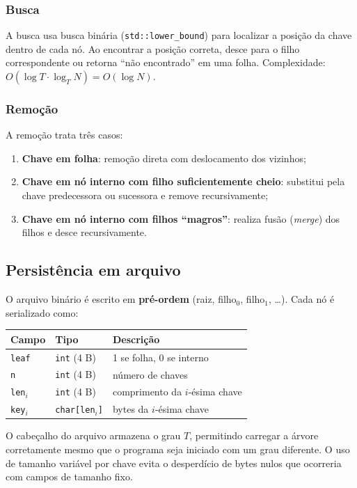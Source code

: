 \documentclass{ifpr-pinhais}
\begin{document}
\subsubsection{Busca}

A busca usa busca binária (\texttt{std::lower\_bound}) para localizar a posição da chave dentro de cada nó. Ao encontrar a posição correta, desce para o filho correspondente ou retorna ``não encontrado'' em uma folha. Complexidade: $O(\log T \cdot \log_T N) = O(\log N)$.

\subsubsection{Remoção}

A remoção trata três casos:
\begin{enumerate}
    \item \textbf{Chave em folha}: remoção direta com deslocamento dos vizinhos;
    \item \textbf{Chave em nó interno com filho suficientemente cheio}: substitui pela chave predecessora ou sucessora e remove recursivamente;
    \item \textbf{Chave em nó interno com filhos ``magros''}: realiza fusão (\textit{merge}) dos filhos e desce recursivamente.
\end{enumerate}

\subsection{Persistência em arquivo}

O arquivo binário é escrito em \textbf{pré-ordem} (raiz, filho$_0$, filho$_1$, \ldots). Cada nó é serializado como:

\begin{center}
\begin{tabular}{lll}
\toprule
Campo & Tipo & Descrição \\
\midrule
\texttt{leaf} & \texttt{int} (4 B) & 1 se folha, 0 se interno \\
\texttt{n} & \texttt{int} (4 B) & número de chaves \\
\texttt{len$_i$} & \texttt{int} (4 B) & comprimento da $i$-ésima chave \\
\texttt{key$_i$} & \texttt{char[len$_i$]} & bytes da $i$-ésima chave \\
\bottomrule
\end{tabular}
\end{center}

O cabeçalho do arquivo armazena o grau $T$, permitindo carregar a árvore corretamente mesmo que o programa seja iniciado com um grau diferente. O uso de tamanho variável por chave evita o desperdício de bytes nulos que ocorreria com campos de tamanho fixo.
\end{document}
